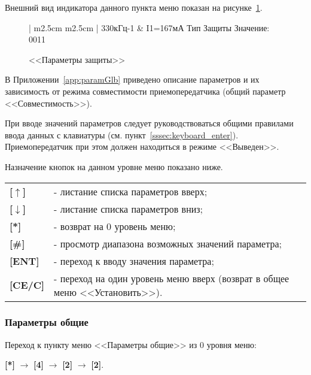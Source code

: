 Внешний вид индикатора данного пункта меню показан на рисунке~\ref{fig:setup_param_def}.
 
\begin{figure}[H]
	\centering
	
	\begin{tabular}{| m{2.5cm}  m{2.5cm} |}
		\firsthline
		330кГц-1	& \raggedleft I1=167мА		\tabularnewline 
		 {Тип Защиты}		\tabularnewline
		 {Значение: 0011} 	\tabularnewline 
		 {}					\tabularnewline 
		\lasthline
	\end{tabular} 
	
	\caption{<<Параметры защиты>>}
	\label{fig:setup_param_def}
\end{figure}

В Приложении~\ref{app:paramGlb} приведено описание параметров и их зависимость от режима совместимости приемопередатчика (общий параметр <<Совместимость>>).

При вводе значений параметров следует руководствоваться общими правилами ввода данных с клавиатуры (см. пункт~\ref{sssec:keyboard_enter}). Приемопередатчик при этом должен находиться в режиме <<Выведен>>.

Назначение кнопок на данном уровне меню показано ниже.
\begin{center}
	\begin{tabular}{p{2cm} p{15cm}}
		\textbf{[$\uparrow$]}  	& - листание списка параметров вверх; \tabularnewline
		\textbf{[$\downarrow$]} & - листание списка параметров вниз; \tabularnewline
		\textbf{[*]} 			& - возврат на 0 уровень меню; \tabularnewline
		\textbf{[\#]} 			& - просмотр диапазона возможных значений параметра; \tabularnewline
		\textbf{[ENT]} 			& - переход к вводу значения параметра; \tabularnewline
		\textbf{[CE/C]} 		& - переход на один уровень меню вверх (возврат в общее меню <<Установить>>). \tabularnewline				
	\end{tabular}
\end{center} 


\subsubsection{Параметры общие} \label{sssec:setup_param_glb}

Переход к пункту меню <<Параметры общие>> из 0 уровня меню:

\textbf{[*]} $\rightarrow$ \textbf{[4]} $\rightarrow$ \textbf{[2]} $\rightarrow$ \textbf{[2]}.

